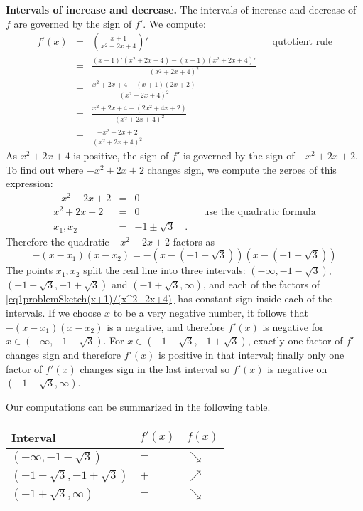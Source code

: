 {\textbf{Intervals of increase and decrease.} 
The intervals of increase and decrease of $f$ are governed by the sign of $f'$. We compute:
\[
\begin{array}{rcll|l}
f'(x)&=&\displaystyle \left(\frac{x+1}{x^2+2x+4}\right)' &&\text{qutotient rule}\\
&=&\displaystyle \frac{(x+1)'\left(x^2+ 2x+4\right)- (x+1)\left( x^2 +2 x+4\right)'}{\left(x^2+2x+4 \right)^2}\\
&=&\displaystyle\frac{ x^2+2x+4-(x+1)(2x+2)}{\left(x^2+2x+4 \right)^2}\\
&=&\displaystyle \frac{x^2+2x+4-\left( 2x^2+ 4x+ 2 \right)}{ \left( x^2 +2x+4 \right)^2}\\
&=&\displaystyle \frac{-x^2-2x+2}{\left(x^2+2x+4 \right)^2}
\end{array}
\] 
As $x^2+2x+4$ is positive, the sign of $f'$ is governed by the sign of $-x^2+2x+2$. To find out where $-x^2+2x+2$ changes sign, we compute the zeroes of this expression:
\[\begin{array}{rcll|l}
-x^2-2x+2&=&0\\
x^2+2x-2&=&0 &&\text{use the quadratic formula}\\
x_1, x_2&=& -1\pm \sqrt{3}\quad .
\end{array}
\]
Therefore the quadratic $-x^2+2x+2$ factors as 
\begin{equation}
\label{eq1problemSketch(x+1)/(x^2+2x+4)}
-(x-x_1)(x-x_2)=-\left(x-\left(-1-\sqrt{3}\right)\right)\left(x-\left(-1+\sqrt{3}\right)\right)
\end{equation} 
The points $x_1, x_2$ split the real line into three intervals: $(-\infty, -1-\sqrt{3})$, $(-1-\sqrt{3}, -1+\sqrt{3})$ and $(-1+ \sqrt{3}, \infty )$, and each of the factors of \eqref{eq1problemSketch(x+1)/(x^2+2x+4)} has constant sign inside each of the intervals. If we choose $x$ to be a very negative number, it follows that $-(x-x_1)(x-x_2)$ is a negative, and therefore $ f'(x)$ is negative for $x\in(-\infty, -1-\sqrt{3})$. For $x\in (-1-\sqrt{3}, -1+\sqrt{3})$, exactly one factor of $f'$ changes sign and therefore $f'(x)$ is positive in that interval; finally only one factor of $f'(x)$ changes sign in the last interval so $f'(x)$ is negative on $(-1+ \sqrt{3}, \infty )$.

Our computations can be summarized in the following table. 

\begin{tabular}{|lll|}\hline
Interval & $f'(x)$ & $f(x)$   \\\hline
$(-\infty, -1-\sqrt{3})$ & $-$& $\searrow $ \\\hline
$(-1-\sqrt{3}, -1+\sqrt{3})$ &$+$&$\nearrow$\\\hline
$( -1+\sqrt{3}, \infty)$&$-$&$\searrow$ \\\hline
\end{tabular}

}
